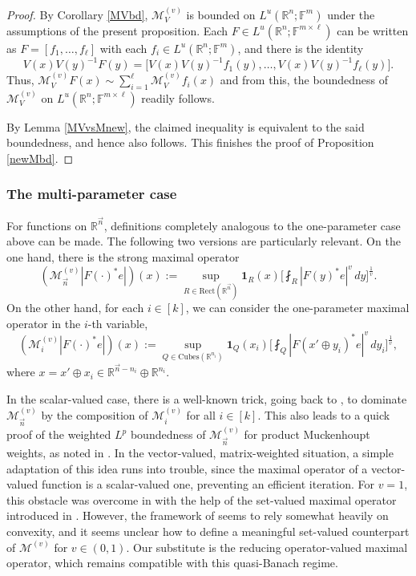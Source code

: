 \documentclass[11pt, reqno]{amsart}
\theoremstyle{definition}
\theoremstyle{remark}
\numberwithin{equation}{section}
\newcommand{\F}{\mathbb F}
\newcommand{\R}{\mathbb R}
\newcommand{\vn}{\vec n}
\newcommand{\one}{\mathbf{1}}
\newcommand{\abs}[1]{|#1|}
\newcommand{\Cubes}{\mathrm{Cubes}}
\newcommand{\Rect}{\mathrm{Rect}}
\begin{document}
\begin{proof}
By Corollary \ref{MVbd}, $\mathcal M_V^{(v)}$ is bounded on $L^u(\R^n;\F^m)$ under the assumptions of the present proposition.
Each $F\in L^u(\R^n;\F^{m\times\ell})$ can be written as $F=[f_1,\ldots,f_\ell]$ with each $f_i\in L^u(\R^n;\F^m)$, and there is the identity
\begin{equation*}
V(x)V(y)^{-1}F(y)
=\Big[V(x)V(y)^{-1}f_1(y),\ldots,V(x)V(y)^{-1}f_\ell(y)\Big].
\end{equation*}
Thus, $\mathcal M_V^{(v)}F(x)\sim\sum_{i=1}^\ell \mathcal M_V^{(v)}f_i(x)$ and from this, the boundedness of $\mathcal M_V^{(v)}$ on $L^u(\R^n;\F^{m\times\ell})$ readily follows.

By Lemma \ref{MVvsMnew}, the claimed inequality is equivalent to the said boundedness, and hence also follows.
This finishes the proof of Proposition \ref{newMbd}.
\end{proof}

\subsubsection{The multi-parameter case}

For functions on $\R^{\vn}$, definitions completely analogous to the one-parameter case above can be made. The following two versions are particularly relevant. On the one hand, there is the strong maximal operator
\begin{equation*}
(\mathcal M^{(v)}_{\vn}\abs{F(\cdot)^*e})(x)
:=\sup_{R\in\Rect(\R^{\vn})}\one_R(x)
\bigg[\fint_R\abs{F(y)^*e}^v \, dy\bigg]^{\frac 1v}.
\end{equation*}
On the other hand, for each $i\in[k]$, we can consider the one-parameter maximal operator in the $i$-th variable,
\begin{equation*}
(\mathcal M^{(v)}_i\abs{F(\cdot)^*e})(x)
:=\sup_{Q\in\Cubes(\R^{n_i})} \one_Q(x_i)
\bigg[ \fint_Q\abs{F(x'\oplus y_i)^*e}^v \, dy_i \bigg]^{\frac 1v},
\end{equation*}
where $x=x'\oplus x_i\in\R^{\vn-n_i}\oplus\R^{n_i}$.

In the scalar-valued case, there is a well-known trick, going back to \cite{JMZ},
to dominate $\mathcal M^{(v)}_{\vn}$ by the composition of $\mathcal M^{(v)}_i$ for all $i\in[k]$. This also leads to a quick proof of the weighted $L^p$ boundedness of
$\mathcal M^{(v)}_{\vn}$ for product Muckenhoupt weights, as noted in \cite[(3.4)]{FS82}. In the vector-valued, matrix-weighted situation,
a simple adaptation of this idea runs into trouble, since the maximal operator of a vector-valued function is a scalar-valued one, preventing an efficient iteration. For $v=1$, this obstacle was overcome in \cite{Vuo24} with the help of the set-valued
maximal operator  introduced in \cite{BCU}. However, the framework of \cite{BCU} seems to rely somewhat heavily on convexity, and it seems unclear how to define a meaningful set-valued counterpart of $\mathcal M^{(v)}$ for $v\in(0,1)$. Our substitute is the reducing operator-valued maximal operator, which remains compatible with this quasi-Banach regime.
\end{document}

